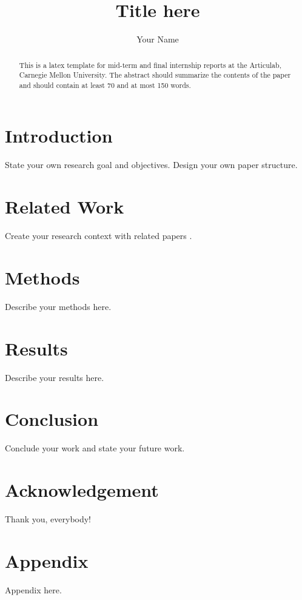 \documentclass[runningheads,a4paper]{llncs}
\begin{document}
\title{Title here}

\author{Your Name}

\maketitle

\begin{abstract}
This is a latex template for mid-term and final internship reports at the Articulab,
Carnegie Mellon University.
The abstract should summarize the contents of the paper and should
contain at least 70 and at most 150 words.
\end{abstract}

\section{Introduction}
State your own research goal and objectives.
Design your own paper structure.

\section{Related Work}
Create your research context with related papers
\cite{cassell2000embodied}.

\section{Methods}
Describe your methods here.

\section{Results}
Describe your results here.

\section{Conclusion}
Conclude your work and state your future work.

\section{Acknowledgement}
Thank you, everybody!




\section{Appendix}
Appendix here.
\end{document}
